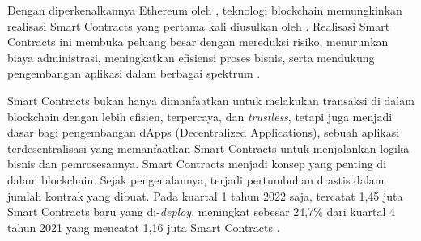 Dengan diperkenalkannya Ethereum oleh \cite{buterin2013ethereum}, teknologi blockchain memungkinkan realisasi Smart Contracts yang pertama kali diusulkan oleh \cite{szabo1997formalizing}. Realisasi Smart Contracts ini membuka peluang besar dengan mereduksi risiko, menurunkan biaya administrasi, meningkatkan efisiensi proses bisnis, serta mendukung pengembangan aplikasi dalam berbagai spektrum \parencite{zheng2020overview}.

Smart Contracts bukan hanya dimanfaatkan untuk melakukan transaksi di dalam blockchain dengan lebih efisien, terpercaya, dan \textit{trustless}, tetapi juga menjadi dasar bagi pengembangan dApps (Decentralized Applications), sebuah aplikasi terdesentralisasi yang memanfaatkan Smart Contracts untuk menjalankan logika bisnis dan pemrosesannya. Smart Contracts menjadi konsep yang penting di dalam blockchain. Sejak pengenalannya, terjadi pertumbuhan drastis dalam jumlah kontrak yang dibuat. Pada kuartal 1 tahun 2022 saja, tercatat 1,45 juta Smart Contracts baru yang di-\textit{deploy}, meningkat sebesar 24,7\% dari kuartal 4 tahun 2021 yang mencatat 1,16 juta Smart Contracts \parencite{alchemy_ethereum_statistics}.

